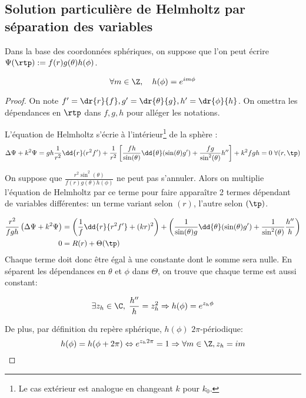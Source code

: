 \subsection{Solution particulière de Helmholtz par séparation des variables}
\begin{hyp}
Dans la base des coordonnées sphériques, on suppose que l'on peut écrire $\Psi(\rtp) : = f(r)g(\theta)h(\phi)$. 
\end{hyp}
\begin{prop}
\begin{equation}
\forall m \in \Z, \quad h(\phi) = e^{im\phi}
\end{equation}
\end{prop}
\begin{proof}
On note $f' =\dr{r}{f}, g' = \dr{\theta}{g} , h' = \dr{\phi}{h}$. On omettra les dépendances en $\rtp$ dans $f,g,h$ pour alléger les notations.

L'équation de Helmholtz s'écrie à l'intérieur\footnote{Le cas extérieur est analogue en changeant $k$ pour $k_0$.} de la sphère : 
\begin{equation}\label{eq:helm:helm}
  \Delta \Psi + k^2 \Psi = gh\frac{1}{r^2}\dd{r}(r^2f') + \frac{1}{r^2}\left[\frac{fh}{\sin(\theta)}\dd{\theta}(\sin(\theta)g')+\frac{fg}{\sin^2(\theta)}h''\right] + k^2 fgh = 0 \; \forall (r,\tp)
\end{equation}

On suppose que $ \frac{r^2\sin^2(\theta)}{f(r)g(\theta)h(\phi)}$ ne peut pas s'annuler. Alors on multiplie l'équation de Helmholtz par ce terme pour faire apparaître 2 termes dépendant de variables différentes: un terme variant selon $(r)$, l'autre selon $(\tp)$. 

\begin{align*}
\frac{r^2}{fgh} \left(\Delta \Psi + k^2 \Psi\right) &= 
\left(\frac{1}{f}\dd{r}{r^2f'} + (kr)^2\right) + 
\left(\frac{1}{ \sin(\theta)g} \dd{\theta}(\sin(\theta)g') +  \frac{1}{ \sin^2(\theta)}\frac{h''}{h} \right)\\
0 &=R(r) + \Theta(\tp)
\end{align*}
Chaque terme doit donc être égal à une constante dont le somme sera nulle. En séparent les dépendances en $\theta$ et $\phi$ dans $\Theta$, on trouve que chaque terme est aussi constant:

\[ 
\exists z_h \in \C,\; \frac{h''}{h} = z_h^2 \Rightarrow h(\phi) = e^{z_h\phi}
\]

De plus, par définition du repère sphérique, $h(\phi)$ $2\pi$-périodique:
\[
h(\phi) = h(\phi + 2\pi) \Leftrightarrow e^{z_h2\pi}= 1 \Rightarrow \forall m \in \Z, z_h = im
\]
\end{proof}

